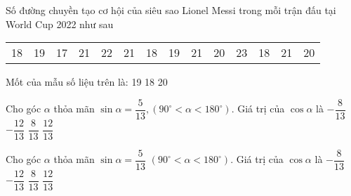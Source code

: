 \begin{ex}%
Số đường chuyền tạo cơ hội của siêu sao Lionel Messi trong mỗi trận đấu tại World Cup 2022 như sau
\begin{center}
	\begin{tabular}{c c c c c c c c c c c c c c}
		18&19&17&21&22&21&18&19&21&20&23&18&21&20\\
	\end{tabular}
\end{center}
Mốt của mẫu số liệu trên là:
\choice
{}
{19}
{18}
{20}
\end{ex}
\begin{ex}%
Cho góc $\alpha$ thỏa mãn $\sin \alpha=\dfrac{5}{13},\left(90^\circ<\alpha<180^\circ\right)$. Giá trị của $\cos \alpha$ là
\choice
{$-\dfrac{8}{13}$}
{\True $-\dfrac{12}{13}$}
{$\dfrac{8}{13}$}
{$\dfrac{12}{13}$}
\end{ex}


\begin{ex}%
   Cho góc $\alpha$ thỏa mãn $\sin \alpha = \dfrac{5}{13}$ $(90^\circ < \alpha < 180^\circ)$. Giá trị của $\cos \alpha$ là
   \choice
   {$-\dfrac{8}{13}$}
   {\True $-\dfrac{12}{13}$}
   {$\dfrac{8}{13}$}
   {$\dfrac{12}{13}$}
\end{ex}

